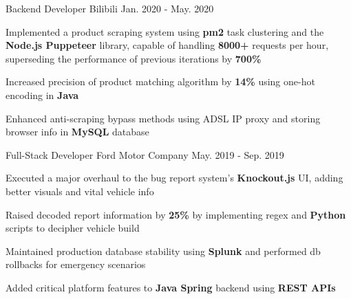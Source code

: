 \begin{cventries}
  \cventry
    {Backend Developer} %
    {Bilibili} %
    {Jan. 2020 - May. 2020} %
    {} %
    {
      \begin{cvitems} %
        \item Implemented a product scraping system using \textbf{pm2} task clustering and the \textbf{Node.js Puppeteer} library, 
        capable of handling \textbf{8000+} requests per hour, superseding the performance of previous iterations by \textbf{700\%}
        \item Increased precision of product matching algorithm by \textbf{14\%} using one-hot encoding in \textbf{Java}
        \item Enhanced anti-scraping bypass methods using ADSL IP proxy and storing browser info in \textbf{MySQL} database
      \end{cvitems}
    }

  \cventry
    {Full-Stack Developer} %
    {Ford Motor Company} %
    {May. 2019 - Sep. 2019} %
    {} %
    {
      \begin{cvitems} %
        \item Executed a major overhaul to the bug report system's \textbf{Knockout.js} UI, adding better visuals and vital vehicle info
        \item Raised decoded report information by \textbf{25\%} by implementing regex and \textbf{Python} scripts to decipher vehicle build
        \item Maintained production database stability using \textbf{Splunk} and performed db rollbacks for emergency scenarios
        \item Added critical platform features to \textbf{Java Spring} backend using \textbf{REST APIs}
      \end{cvitems}
    }

\end{cventries}
